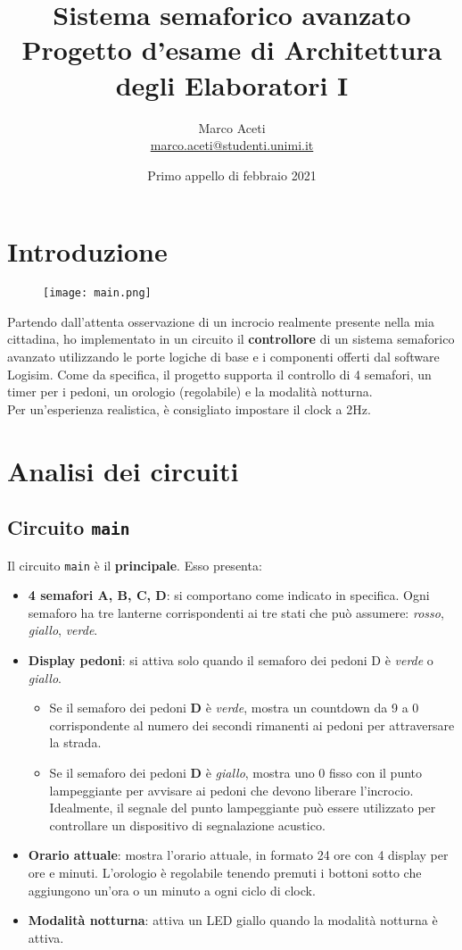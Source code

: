 \documentclass{article}
\title{%
Sistema semaforico avanzato \\
\large{Progetto d'esame di Architettura degli Elaboratori I} \\
}
\author{Marco Aceti \\
\small{\href{mailto:marco.aceti@studenti.unimi.it}{marco.aceti@studenti.unimi.it}}
}
\date{Primo appello di febbraio 2021}
\def\code#1{\texttt{#1}}
\begin{document}
\maketitle

\section{Introduzione}

\begin{figure}[htp]
    \centering
    \texttt{[image: main.png]}
\end{figure}

Partendo dall'attenta osservazione di un incrocio realmente presente nella mia cittadina, ho implementato in un circuito il \textbf{controllore} di un sistema semaforico avanzato utilizzando le porte logiche di base e i componenti offerti dal software Logisim.
Come da specifica, il progetto supporta il controllo di 4 semafori, un timer per i pedoni, un orologio (regolabile) e la modalità notturna. \\
Per un'esperienza realistica, è consigliato impostare il clock a 2Hz. 

\clearpage

\section{Analisi dei circuiti}
\subsection{Circuito \code{main}}
Il circuito \code{main} è il \textbf{principale}. Esso presenta:
\begin{itemize}
    \item \textbf{4 semafori A, B, C, D}: si comportano come indicato in specifica. Ogni semaforo ha tre lanterne corrispondenti ai tre stati che può assumere: \textit{rosso}, \textit{giallo}, \textit{verde}.
    \item \textbf{Display pedoni}: si attiva solo quando il semaforo dei pedoni D è \textit{verde} o \textit{giallo}.
    \begin{itemize}
        \item Se il semaforo dei pedoni \textbf{D} è \textit{verde}, mostra un countdown da 9 a 0 corrispondente al numero dei secondi rimanenti ai pedoni per attraversare la strada.
        \item Se il semaforo dei pedoni \textbf{D} è \textit{giallo}, mostra uno 0 fisso con il punto lampeggiante per avvisare ai pedoni che devono liberare l'incrocio. Idealmente, il segnale del punto lampeggiante può essere utilizzato per controllare un dispositivo di segnalazione acustico.
    \end{itemize}
    \item \textbf{Orario attuale}: mostra l'orario attuale, in formato 24 ore con 4 display per ore e minuti. L'orologio è regolabile tenendo premuti i bottoni sotto che aggiungono un'ora o un minuto a ogni ciclo di clock.
    \item \textbf{Modalità notturna}: attiva un LED giallo quando la modalità notturna è attiva.
\end{itemize}
\end{document}
